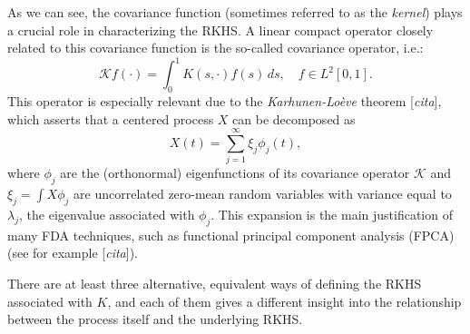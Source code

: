 \documentclass[ba]{imsart}
\numberwithin{equation}{section}
\theoremstyle{plain}
\newcommand\incomment[1]{\color{red}[\textit{#1}]\color{black}}
\begin{document}
As we can see, the covariance function (sometimes referred to as the \textit{kernel}) plays a crucial role in characterizing the RKHS. A linear compact operator closely related to this covariance function is the so-called covariance operator, i.e.:
\[
\mathcal Kf(\cdot) = \int_0^1 K(s, \cdot)f(s)\, ds, \quad f \in L^2[0, 1].
\]
This operator is especially relevant due to the \textit{Karhunen-Loève} theorem \incomment{cita}, which asserts that a centered process \(X\) can be decomposed as
\begin{equation}\label{eq:karhunen-loeve}
X(t) = \sum_{j=1}^\infty \xi_j \phi_j(t),
\end{equation}
where \(\phi_j\) are the (orthonormal) eigenfunctions of its covariance operator \(\mathcal K\) and \(\xi_j = \int X\phi_j\) are uncorrelated zero-mean random variables with variance equal to \(\lambda_j\), the eigenvalue associated with \(\phi_j\). This expansion is the main justification of many FDA techniques, such as functional principal component analysis (FPCA) (see for example \incomment{cita}).

There are at least three alternative, equivalent ways of defining the RKHS associated with \(K\), and each of them gives a different insight into the relationship between the process itself and the underlying RKHS.
\end{document}
